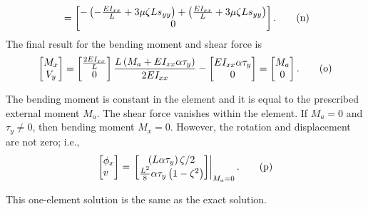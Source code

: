 \documentclass{AeroStructure-ERJohnson}
\begin{document}
\begin{example}
\begin{align}
&\quad=\left[\begin{array}{@{}c@{}}
-\left(-\frac{EI_{x x}}{L}+3\mu\zeta L s_{yy}\right)+\left(\frac{E I_{x x}}{L}+3 \mu \zeta L s_{y y}\right) \\
0
\end{array}\right]. \label{eq17.3.n}\tag{n}
\end{align}
The final result for the bending moment and shear force is\vspace*{4pt}
\begin{equation}
\left[\begin{array}{@{}c@{}} M_{x} \\ V_{y} \end{array}\right]=\left[\begin{array}{@{}c@{}}
\frac{2 E I_{x x}}{L} \\ 0 \end{array}\right] \frac{L\left(M_{a}+E I_{x x} \alpha \tau_{y}\right)}{2 E I_{x x}}-\left[\begin{array}{@{}c@{}} E I_{x x} \alpha \tau_{y} \\ 0 \end{array}\right]=\left[\begin{array}{@{}c@{}} M_{a} \\0 \end{array}\right]. \label{eq17.3.o}\tag{o}
\end{equation}

\vspace*{-8pt}

\noindent The\enlargethispage{1.56\baselineskip} bending moment is constant in the element and it is equal to the prescribed external moment $M_{a}$. The shear force vanishes within the element. If $M_{a}=0$ and $\tau_{y} \neq 0$, then bending moment $M_{x}=0$. However, the rotation and displacement are not zero; i.e.,
\begin{equation}
\left[\begin{array}{@{}l@{}}\phi_{x} \\v\end{array}\right]=\left.\left[\begin{array}{@{}c@{}}\left(L \alpha \tau_{y}\right) \zeta/2 \\\frac{L^{2}}{8} \alpha \tau_{y}\left(1-\zeta^{2}\right)\end{array}\right]\right|_{M_{a}=0}. \label{eq17.3.p}\tag{p}
\end{equation}

\vspace*{-4pt}

\noindent This one-element solution is the same as the exact solution.
\end{example}
\end{document}
